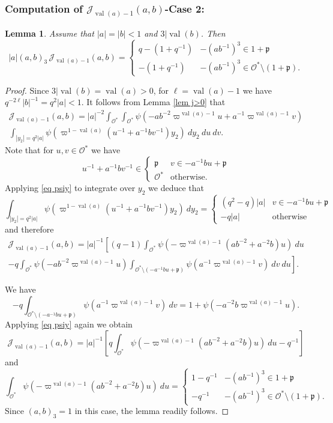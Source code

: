 \documentclass[12pt]{amsart}
\newcommand{\abs}[1]{\left|{#1}\right|}
\newcommand{\p}{\mathfrak{p}}
\newcommand{\J}{\mathcal{J}}
\renewcommand{\O}{\mathcal{O}}
\newcommand{\val}{{\operatorname{val}}}
\newtheorem{lemma}[theorem]{Lemma}
\theoremstyle{remark}
\begin{document}
\subsubsection{Computation of $\J_{\val(a)-1}(a,b)$-Case 2:} 
\begin{lemma}\label{lem j1 case2}
Assume that $\abs{a}=\abs{b}<1$ and $3 |\val(b)$. 
Then
\[
\abs{a}(a,b)_3\,\J_{\val(a)-1}(a,b)=\begin{cases} q-(1+q^{-1}) & -(ab^{-1})^3\in1+\p \\ -(1+q^{-1}) & -(ab^{-1})^3\in \O^*\setminus (1+\p). \end{cases}
\]
\end{lemma}
\begin{proof}
Since $3|\val(b)=\val(a)>0$, for $\ell=\val(a)-1$ we have $q^{-2\ell}\abs{b}^{-1}=q^{2}\abs{a}<1$. It follows from Lemma \ref{lem j>0} that
\begin{multline*}
\J_{\val(a)-1}(a,b)=\abs{a}^{-2}\int_{\O^*}\int_{\O^*} \psi(-ab^{-2}\varpi^{\val(a)-1}u+a^{-1}\varpi^{\val(a)-1} v) \\
\int_{\abs{y_2}=q^2\abs{a}} \psi(\varpi^{1-\val(a)} (u^{-1}+a^{-1}bv^{-1})y_2)\ dy_2\ du\ dv.
\end{multline*}
Note that for $u,v\in\O^*$ we have
\[
u^{-1}  +a^{-1}bv^{-1}\in\begin{cases} \p & v\in -a^{-1}bu+\p \\ \O^* & \text{otherwise.}\end{cases}
\]
Applying \eqref{eq psiy} to integrate over $y_2$ we deduce that
\[
\int_{\abs{y_2}=q^2\abs{a}} \psi(\varpi^{1-\val(a)} (u^{-1}+a^{-1}bv^{-1})y_2)\ dy_2=\begin{cases} (q^2-q)\abs{a} & v\in -a^{-1}bu+\p \\ -q\abs{a}& \text{otherwise} \end{cases}
\]
and therefore
\begin{multline*}
\J_{\val(a)-1}(a,b)=\abs{a}^{-1} \left[(q-1)\int_{\O^*} \psi(-\varpi^{\val(a)-1}(ab^{-2}+a^{-2}b)u)\ du \right. \\ \left.
-q\int_{\O^*} \psi(-ab^{-2}\varpi^{\val(a)-1}u) \int_{\O^*\setminus (-a^{-1}bu+\p)} \psi(a^{-1}\varpi^{\val(a)-1} v) \ dv \ du \right].
\end{multline*}

We have
\[
-q \int_{\O^*\setminus (-a^{-1}bu+\p)} \psi(a^{-1}\varpi^{\val(a)-1} v) \ dv=1+\psi(-a^{-2}b\varpi^{\val(a)-1} u).
\]
Applying \eqref{eq psiy} again we obtain
\[
\J_{\val(a)-1}(a,b)=\abs{a}^{-1} \left[q\int_{\O^*} \psi(-\varpi^{\val(a)-1}(ab^{-2}+a^{-2}b)u)\ du-q^{-1}\right]
\]
and
\[
\int_{\O^*} \psi(-\varpi^{\val(a)-1}(ab^{-2}+a^{-2}b)u)\ du=\begin{cases} 1-q^{-1} & -(ab^{-1})^3\in1+\p \\ -q^{-1} & -(ab^{-1})^3\in \O^*\setminus (1+\p). \end{cases}
\]
Since $(a,b)_3=1$ in this case, the lemma readily follows.
\end{proof}
\end{document}
